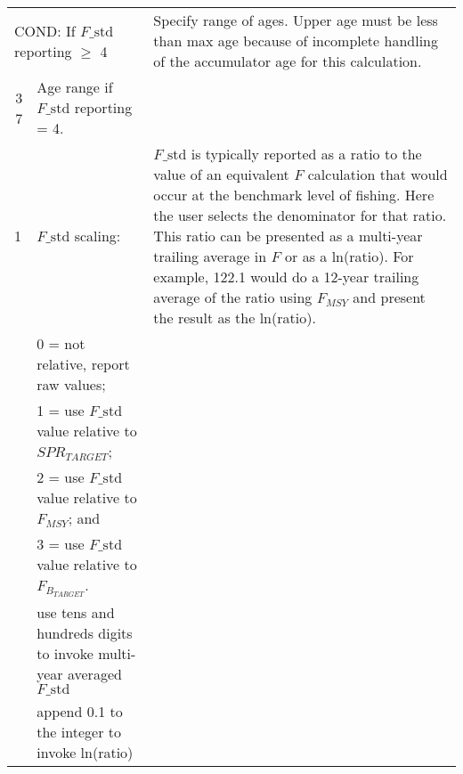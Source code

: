{\begin{landscape}
\begin{longtable}{p{1.5cm} p{7.2cm} p{12.3cm}}
 \hline
 \multicolumn{2}{l}{COND: If $F\text{\_std}$ reporting $\geq$ 4} & \multirow{1}{1cm}[-0.25cm]{\parbox{12.5cm}{Specify range of ages. Upper age must be less than max age because of incomplete handling of the accumulator age for this calculation.}} \Tstrut\\
 \multicolumn{1}{r}{3 7}  & Age range if $F\text{\_std}$ reporting = 4. & \Tstrut\Bstrut\\

 \hline
 1 & $F\text{\_std}$ scaling: & \multirow{1}{1cm}[-0.25cm]{\parbox{12.5cm}{$F\text{\_std}$ is typically reported as a ratio to the value of an equivalent $F$ calculation that would occur at the benchmark level of fishing. Here the user selects the denominator for that ratio. This ratio can be presented as a multi-year trailing average in $F$ or as a ln(ratio). For example, 122.1 would do a 12-year trailing average of the ratio using $F_{MSY}$ and present the result as the ln(ratio).}} \Tstrut\\
   & 0 = not relative, report raw values; & \\
   & 1 = use $F\text{\_std}$ value relative to $SPR_{TARGET}$; & \\
   & 2 = use $F\text{\_std}$ value relative to $F_{MSY}$; and & \\
   & 3 = use $F\text{\_std}$ value relative to $F_{B_{TARGET}}$. & \\
   & use tens and hundreds digits to invoke multi-year averaged $F\text{\_std}$ & \\
   & append 0.1 to the integer to invoke ln(ratio) & \Bstrut\\


\end{longtable}
\end{landscape}}

